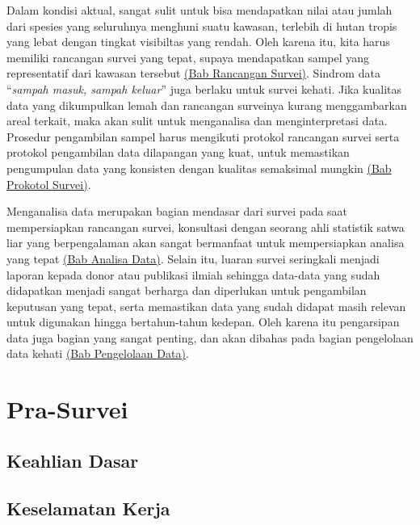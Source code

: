 \documentclass[
]{book}
\begin{document}
Dalam kondisi aktual, sangat sulit untuk bisa mendapatkan nilai atau jumlah dari spesies yang seluruhnya menghuni suatu kawasan, terlebih di hutan tropis yang lebat dengan tingkat visibiltas yang rendah. Oleh karena itu, kita harus memiliki rancangan survei yang tepat, supaya mendapatkan sampel yang representatif dari kawasan tersebut \protect\hyperlink{rancangan-survei}{(Bab Rancangan Survei)}. Sindrom data ``\emph{sampah masuk, sampah keluar}'' juga berlaku untuk survei kehati. Jika kualitas data yang dikumpulkan lemah dan rancangan surveinya kurang menggambarkan areal terkait, maka akan sulit untuk menganalisa dan menginterpretasi data. Prosedur pengambilan sampel harus mengikuti protokol rancangan survei serta protokol pengambilan data dilapangan yang kuat, untuk memastikan pengumpulan data yang konsisten dengan kualitas semaksimal mungkin \protect\hyperlink{protokol-survei}{(Bab Prokotol Survei)}.

Menganalisa data merupakan bagian mendasar dari survei pada saat mempersiapkan rancangan survei, konsultasi dengan seorang ahli statistik satwa liar yang berpengalaman akan sangat bermanfaat untuk mempersiapkan analisa yang tepat \protect\hyperlink{analisa-data}{(Bab Analisa Data)}. Selain itu, luaran survei seringkali menjadi laporan kepada donor atau publikasi ilmiah sehingga data-data yang sudah didapatkan menjadi sangat berharga dan diperlukan untuk pengambilan keputusan yang tepat, serta memastikan data yang sudah didapat masih relevan untuk digunakan hingga bertahun-tahun kedepan. Oleh karena itu pengarsipan data juga bagian yang sangat penting, dan akan dibahas pada bagian pengelolaan data kehati \protect\hyperlink{pengelolaan-data}{(Bab Pengelolaan Data)}.

\hypertarget{pra-survei}{%
\chapter*{Pra-Survei}\label{pra-survei}}

\hypertarget{keahlian-dasar}{%
\section*{Keahlian Dasar}\label{keahlian-dasar}}

\hypertarget{keselamatan-kerja}{%
\section*{Keselamatan Kerja}\label{keselamatan-kerja}}
\end{document}
